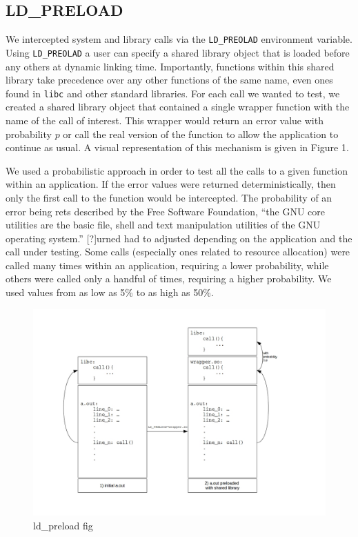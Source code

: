 \documentclass[10pt]{article}
\begin{document}
\subsection{LD\_PRELOAD}
We intercepted system and library calls via the \texttt{LD\_PREOLAD} environment variable. Using \texttt{LD\_PREOLAD} a user can specify a shared library object that is loaded before any others at dynamic linking time. Importantly, functions within this shared library take precedence over any other functions of the same name, even ones found in \texttt{libc} and other standard libraries. For each call we wanted to test, we created a shared library object that contained a single wrapper function with the name of the call of interest. This wrapper would return an error value with probability $p$ or call the real version of the function to allow the application to continue as usual. A visual representation of this mechanism is given in Figure 1.

We used a probabilistic approach in order to test all the calls to a given function within an application. If the error values were returned deterministically, then only the first call to the function would be intercepted. The probability of an error being rets described by the Free Software Foundation, “the GNU core utilities are the basic file, shell and text manipulation utilities of the GNU operating system.” [?]urned had to adjusted depending on the application and the call under testing. Some calls (especially ones related to resource allocation) were called many times within an application, requiring a lower probability, while others were called only a handful of times, requiring a higher probability. We used values from as low as 5\% to as high as 50\%.

\begin{figure}
	\caption{ld\_preload fig}
	\includegraphics[width=\textwidth]{ldpreload_fig.jpg}
\end{figure}
\end{document}
